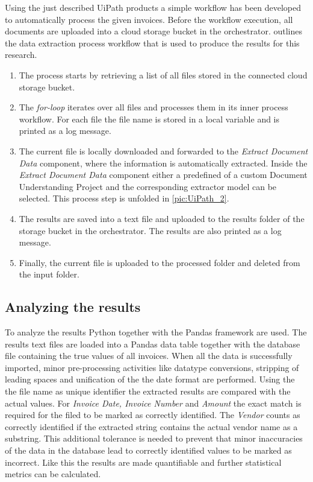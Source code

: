 Using the just described UiPath products a simple workflow has been developed to automatically process the given invoices.
Before the workflow execution, all documents are uploaded into a cloud storage bucket in the orchestrator.  outlines the data extraction process workflow that is used to produce the results for this research. 
\begin{enumerate}
    \item The process starts by retrieving a list of all files stored in the connected cloud storage bucket. 
    \item The \textit{for-loop} iterates over all files and processes them in its inner process workflow. For each file the file name is stored in a local variable and is printed as a log message. 
    \item The current file is locally downloaded and forwarded to the \textit{Extract Document Data} component, where the information is automatically extracted. Inside the \textit{Extract Document Data} component either a predefined of a custom Document Understanding Project and the corresponding extractor model can be selected. This process step is unfolded in \cref{pic:UiPath_2}.
    \item The results are saved into a text file and uploaded to the results folder of the storage bucket in the orchestrator. The results are also printed as a log message. 
    \item Finally, the current file is uploaded to the processed folder and deleted from the input folder.
\end{enumerate}

\subsection{Analyzing the results}
To analyze the results Python together with the Pandas framework are used. The results text files are loaded into a Pandas data table together with the database file
containing the true values of all invoices. When all the data is successfully imported, minor pre-processing activities like datatype conversions, stripping of leading spaces and unification of the the date format are performed.
Using the the file name as unique identifier the extracted results are compared with the actual values. For \textit{Invoice Date, Invoice Number}
and \textit{Amount} the exact match is required for the filed to be marked as correctly identified. 
The \textit{Vendor} counts as correctly identified if the extracted string contains the actual vendor name as a substring. This additional tolerance is needed to prevent that minor inaccuracies of the data in the database lead to correctly identified values to be marked as incorrect.
Like this the results are made quantifiable and further statistical metrics can be calculated.
